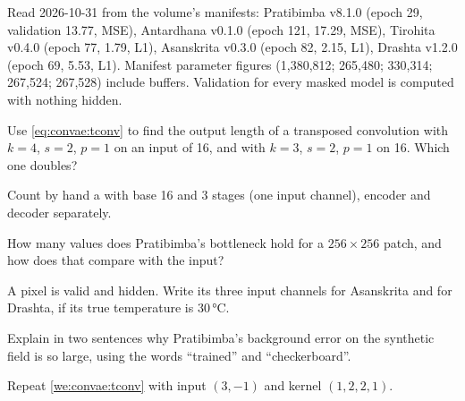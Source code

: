 \begin{drift}
Read 2026-10-31 from the  volume's manifests: Pratibimba v8.1.0 (epoch 29, validation 13.77, MSE),
Antardhana v0.1.0 (epoch 121, 17.29, MSE), Tirohita v0.4.0 (epoch 77, 1.79, L1), Asanskrita v0.3.0 (epoch 82, 2.15, L1),
Drashta v1.2.0 (epoch 69, 5.53, L1). Manifest parameter figures (1,380,812; 265,480; 330,314; 267,524; 267,528) include
buffers. Validation for every masked model is computed with nothing hidden.
\end{drift}

\begin{confusions}
\end{confusions}

\begin{checkyourself}
\item\label{ex:convae:1} Use \cref{eq:convae:tconv} to find the output length of a transposed convolution with $k=4$,
$s=2$, $p=1$ on an input of 16, and with $k=3$, $s=2$, $p=1$ on 16. Which one doubles?
\item\label{ex:convae:2} Count by hand a  with base 16 and 3 stages (one input channel), encoder
and decoder separately.
\item\label{ex:convae:3} How many values does Pratibimba's bottleneck hold for a $256\times256$ patch, and how does that
compare with the input?
\item\label{ex:convae:4} A pixel is valid and hidden. Write its three input channels for Asanskrita and for Drashta, if
its true temperature is 30\,°C.
\item\label{ex:convae:5} Explain in two sentences why Pratibimba's background error on the synthetic field is so large,
using the words ``trained'' and ``checkerboard''.
\item\label{ex:convae:6} Repeat \cref{we:convae:tconv} with input $(3,-1)$ and kernel $(1,2,2,1)$.
\end{checkyourself}

